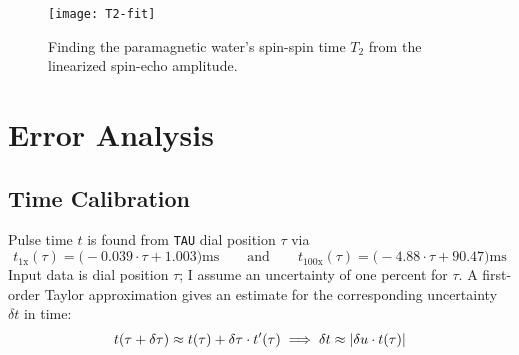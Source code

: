 \documentclass[11pt, a4paper]{article}
\newcommand{\eqtext}[1]{\qquad \text{#1} \qquad}
\begin{document}
\begin{figure}[htb!]
\centering
\texttt{[image: T2-fit]}
\caption{Finding the paramagnetic water's spin-spin time $ T_{2} $ from the linearized spin-echo amplitude.}
\label{nmr:fig:T2-fit}
\end{figure}


	

\section{Error Analysis}
\subsection{Time Calibration}
Pulse time $ t $ is found from \texttt{TAU} dial position $ \tau $ via
\begin{equation*}
	t_{\text{1x}}(\tau) = \big(- 0.039 \cdot \tau + 1.003 \big) \si{\milli \second} \eqtext{and} 	t_{\text{100x}}(\tau) = \big(- 4.88 \cdot \tau + 90.47 \big) \si{\milli \second}
\end{equation*}
Input data is dial position $ \tau $; I assume an uncertainty of one percent for $ \tau $. A first-order Taylor approximation gives an estimate for the corresponding uncertainty $ \delta t $ in time:
\begin{equation*}
	t(\tau + \delta \tau) \approx t(\tau)  + \delta \tau \cdot t'(\tau) \implies \delta t \approx \abs{\delta u \cdot t(\tau)}
\end{equation*}
\end{document}
